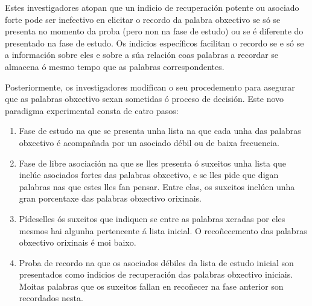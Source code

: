 \documentclass[a4paper,11pt]{article}
\begin{document}
Estes investigadores atopan que un indicio de recuperación potente ou asociado forte pode ser inefectivo en elicitar o recordo da palabra obxectivo se só se presenta no momento da proba (pero non na fase de estudo) ou se é diferente do presentado na fase de estudo. Os indicios específicos facilitan o recordo se e só se a información sobre eles e sobre a súa relación coas palabras a recordar se almacena ó mesmo tempo que as palabras correspondentes. 

Posteriormente, os investigadores modifican o seu procedemento para asegurar que as palabras obxectivo sexan sometidas ó proceso de decisión. Este novo paradigma experimental consta de catro pasos:
\begin{enumerate}
	\item Fase de estudo na que se presenta unha lista na que cada unha das palabras obxectivo é 
	acompañada por un asociado débil ou de baixa frecuencia. 
	\item Fase de libre asociación na que se lles presenta ó suxeitos unha lista que inclúe 
	asociados fortes das palabras obxectivo, e se lles pide que digan palabras nas que estes lles 
	fan pensar. Entre elas, os suxeitos inclúen unha gran porcentaxe das palabras obxectivo 
	orixinais. 
	\item Pídeselles ós suxeitos que indiquen se entre as palabras xeradas por eles mesmos hai 
	algunha pertencente á lista inicial. O recoñecemento das palabras obxectivo orixinais é moi 
	baixo.
	\item Proba de recordo na que os asociados débiles da lista de estudo inicial son presentados 
	como indicios de recuperación das palabras obxectivo iniciais. Moitas palabras que os suxeitos 
	fallan en recoñecer na fase anterior son recordados nesta. 
\end{enumerate}
\end{document}

